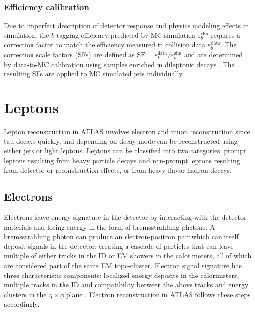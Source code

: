 \documentclass[../thesis.tex]{subfiles}
\begin{document}
\subsubsection*{Efficiency calibration}
Due to imperfect description of detector response and physics modeling effects in simulation, the $b$-tagging efficiency predicted by \acs{MC} simulation $\varepsilon_b^\mathrm{sim}$ requires a correction factor to match the efficiency measured in collision data $\varepsilon_b^\mathrm{data}$. The correction scale factors (\acs{SF}s) are defined as $\mathrm{SF}=\varepsilon_b^\mathrm{data}/\varepsilon_b^\mathrm{sim}$ and are determined by data-to-\acs{MC} calibration using samples enriched in dileptonic \ttbar decays \citep{ftag:calib}. The resulting \acs{SF}s are applied to \acs{MC} simulated jets individually.


\section{Leptons}
Lepton reconstruction in ATLAS involves electron and muon reconstruction since tau decays quickly, and depending on decay mode can be reconstructed using either jets or light leptons.  Leptons can be classified into two categories: prompt leptons resulting from heavy particle decays and non-prompt leptons resulting from detector or reconstruction effects, or from heavy-flavor hadron decays.

\subsection{Electrons}
\label{sec:electron}
Electrons leave energy signature in the detector by interacting with the detector materials and losing energy in the form of bremsstrahlung photons. A bremsstrahlung photon can produce an electron-positron pair which can itself deposit signals in the detector, creating a cascade of particles that can leave multiple of either tracks in the \acs{ID} or \acs{EM} showers in the calorimeters, all of which are considered part of the same \acs{EM} topo-cluster. Electron signal signature has three characteristic components: localized energy deposits in the calorimeters, multiple tracks in the \acs{ID} and compatibility between the above tracks and energy clusters in the $\eta \times \phi$ plane \citep{reco:electron_id}. Electron reconstruction in ATLAS follows these steps accordingly.
\end{document}
